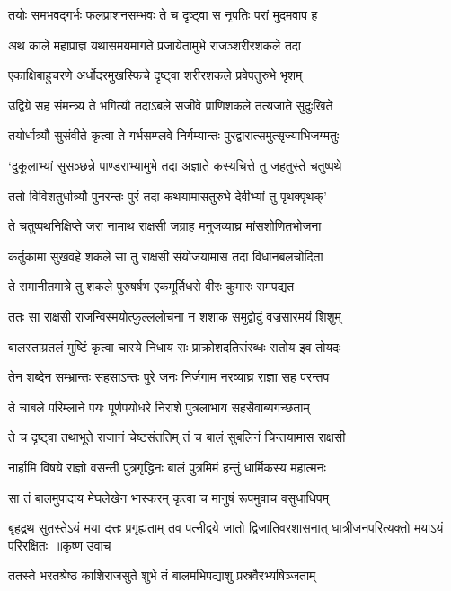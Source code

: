 \twolineshloka
{तयोः समभवद्गर्भः फलप्राशनसम्भवः}
{ते च दृष्ट्वा स नृपतिः परां मुदमवाप ह}


\twolineshloka
{अथ काले महाप्राज्ञ यथासमयमागते}
{प्रजायेतामुभे राजञ्शरीरशकले तदा}


\twolineshloka
{एकाक्षिबाहुचरणे अर्धोदरमुखस्फिचे}
{दृष्ट्वा शरीरशकले प्रवेपतुरुभे भृशम्}


\twolineshloka
{उद्विग्रे सह संमन्त्र्य ते भगित्यौ तदाऽबले}
{सजीवे प्राणिशकले तत्यजाते सुदुःखिते}


\twolineshloka
{तयोर्धात्र्यौ सुसंवीते कृत्वा ते गर्भसम्प्लवे}
{निर्गम्यान्तः पुरद्वारात्समुत्सृज्याभिजग्मतुः}


\twolineshloka
{`दुकूलाभ्यां सुसञ्छन्ने पाण्डराभ्यामुभे तदा}
{अज्ञाते कस्यचित्ते तु जहतुस्ते चतुष्पथे}


\twolineshloka
{ततो विविशतुर्धात्र्यौ पुनरन्तः पुरं तदा}
{कथयामासतुरुभे देवीभ्यां तु पृथक्पृथक्'}


\twolineshloka
{ते चतुष्पथनिक्षिप्ते जरा नामाथ राक्षसी}
{जग्राह मनुजव्याघ्र मांसशोणितभोजना}


\twolineshloka
{कर्तुकामा सुखवहे शकले सा तु राक्षसी}
{संयोजयामास तदा विधानबलचोदिता}


\twolineshloka
{ते समानीतमात्रे तु शकले पुरुषर्षभ}
{एकमूर्तिधरो वीरः कुमारः समपद्यत}


\twolineshloka
{ततः सा राक्षसी राजन्विस्मयोत्फुल्ललोचना}
{न शशाक समुद्वोदुं वज्रसारमयं शिशुम्}


\twolineshloka
{बालस्ताम्रतलं मुष्टिं कृत्वा चास्ये निधाय सः}
{प्राक्रोशदतिसंरब्धः सतोय इव तोयदः}


\twolineshloka
{तेन शब्देन सम्भ्रान्तः सहसाऽन्तः पुरे जनः}
{निर्जगाम नरव्याघ्र राज्ञा सह परन्तप}


\twolineshloka
{ते चाबले परिम्लाने पयः पूर्णपयोधरे}
{निराशे पुत्रलाभाय सहसैवाब्यगच्छताम्}


\twolineshloka
{ते च दृष्ट्वा तथाभूते राजानं चेष्टसंततिम्}
{तं च बालं सुबलिनं चिन्तयामास राक्षसी}


\twolineshloka
{नार्हामि विषये राज्ञो वसन्ती पुत्रगृद्धिनः}
{बालं पुत्रमिमं हन्तुं धार्मिकस्य महात्मनः}


\twolineshloka
{सा तं बालमुपादाय मेघलेखेन भास्करम्}
{कृत्वा च मानुषं रूपमुवाच वसुधाधिपम्}


\fourlineindentedshloka
{बृहद्रथ सुतस्तेऽयं मया दत्तः प्रगृह्यताम्}
{तव पत्नीद्वये जातो द्विजातिवरशासनात्}
{धात्रीजनपरित्यक्तो मयाऽयं परिरक्षितः ॥कृष्ण उवाच}
{}


\twolineshloka
{ततस्ते भरतश्रेष्ठ काशिराजसुते शुभे}
{तं बालमभिपद्याशु प्रस्रवैरभ्यषिञ्जताम्}


